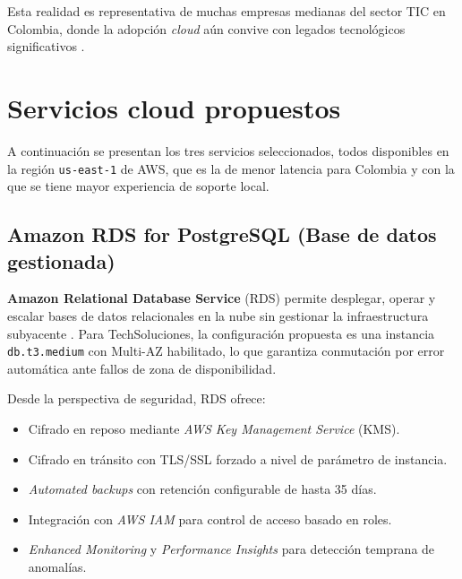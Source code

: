 \documentclass[12pt, a4paper]{article}
\begin{document}
Esta realidad es representativa de muchas empresas medianas del sector TIC en Colombia, donde la adopción \textit{cloud} aún convive con legados tecnológicos significativos \autocite{MinTIC2023}.

\section{Servicios cloud propuestos}

A continuación se presentan los tres servicios seleccionados, todos disponibles en la región \texttt{us-east-1} de AWS, que es la de menor latencia para Colombia y con la que se tiene mayor experiencia de soporte local.

\subsection{Amazon RDS for PostgreSQL (Base de datos gestionada)}

\textbf{Amazon Relational Database Service} (RDS) permite desplegar, operar y escalar bases de datos relacionales en la nube sin gestionar la infraestructura subyacente \autocite{AWS2024RDS}. Para TechSoluciones, la configuración propuesta es una instancia \texttt{db.t3.medium} con Multi-AZ habilitado, lo que garantiza conmutación por error automática ante fallos de zona de disponibilidad.

Desde la perspectiva de seguridad, RDS ofrece:

\begin{itemize}
  \item Cifrado en reposo mediante \textit{AWS Key Management Service} (KMS).
  \item Cifrado en tránsito con TLS/SSL forzado a nivel de parámetro de instancia.
  \item \textit{Automated backups} con retención configurable de hasta 35 días.
  \item Integración con \textit{AWS IAM} para control de acceso basado en roles.
  \item \textit{Enhanced Monitoring} y \textit{Performance Insights} para detección temprana de anomalías.
\end{itemize}
\end{document}

